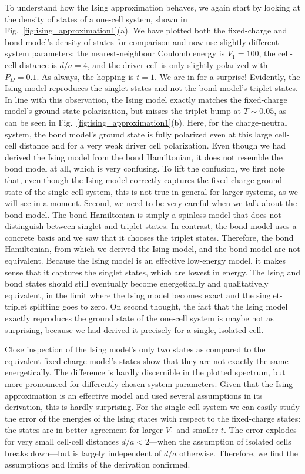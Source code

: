 To understand how the Ising approximation behaves, we again start by looking at
the density of states of a one-cell system, shown in
Fig.~\ref{fig:ising_approximation1}(a). We have plotted both the fixed-charge
and bond model's density of states for comparison and now use slightly different
system parameters: the nearest-neighbour Coulomb energy is $V_1 = 100$, the
cell-cell distance is $d/a = 4$, and the driver cell is only slightly polarized
with $P_D = 0.1$. As always, the hopping is $t=1$. We are in for a surprise!
Evidently, the Ising model reproduces the singlet states and not the bond
model's triplet states. In line with this observation, the Ising model exactly
matches the fixed-charge model's ground state polarization, but misses the
triplet-bump at $T \sim 0.05$, as can be seen in
Fig.~\ref{fig:ising_approximation1}(b). Here, for the charge-neutral system,
the bond model's ground state is fully polarized even at this large cell-cell
distance and for a very weak driver cell polarization. Even though we had
derived the Ising model from the bond Hamiltonian, it does not resemble the bond
model at all, which is very confusing. To lift the confusion, we first note
that, even though the Ising model correctly captures the fixed-charge ground
state of the single-cell system, this is not true in general for larger systems,
as we will see in a moment. Second, we need to be very careful when we talk
about the bond model. The bond Hamiltonian is simply a spinless model that does
not distinguish between singlet and triplet states. In contrast, the bond model
uses a concrete basis and we saw that it chooses the triplet states. Therefore,
the bond Hamiltonian, from which we derived the Ising model, and the bond model
are not equivalent. Because the Ising model is an effective low-energy model, it
makes sense that it captures the singlet states, which are lowest in energy. The
Ising and bond states should still eventually become energetically and
qualitatively equivalent, in the limit where the Ising model becomes exact and
the singlet-triplet splitting goes to zero. On second thought, the fact that the
Ising model exactly reproduces the ground state of the one-cell system is maybe
not as surprising, because we had derived it precisely for a single, isolated
cell.

Close inspection of the Ising model's only two states as compared to the
equivalent fixed-charge model's states show that they are not exactly the same
energetically. The difference is hardly discernible in the plotted spectrum, but
more pronounced for differently chosen system parameters. Given that the Ising
approximation is an effective model and used several assumptions in its
derivation, this is hardly surprising. For the single-cell system we can easily
study the error of the energies of the Ising states with respect to the
fixed-charge states: the states are in better agreement for larger $V_1$ and
smaller $t$. The error explodes for very small cell-cell distances $d/a <
2$---when the assumption of isolated cells breaks down---but is largely
independent of $d/a$ otherwise. Therefore, we find the assumptions and limits of
the derivation confirmed.

